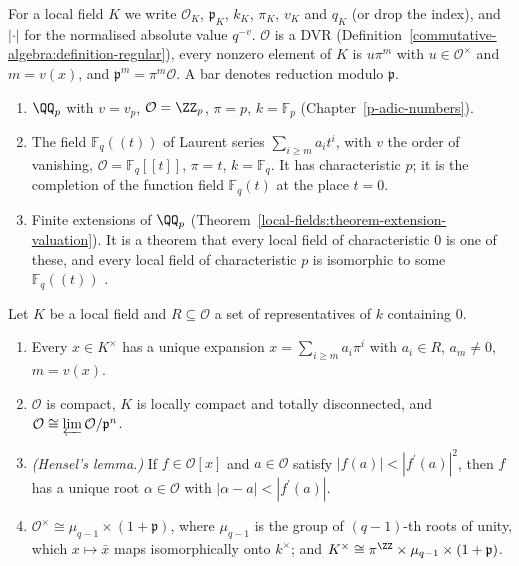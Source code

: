 \begin{notation}\label{local-fields:notation-local}
For a local field $K$ we write $\mathcal{O}_K$, $\mathfrak{p}_K$, $k_K$, $\pi_K$, $v_K$ and $q_K$ (or drop the index), and $|\cdot|$ for the normalised absolute value $q^{-v}$. $\mathcal{O}$ is a DVR
(Definition~\ref{commutative-algebra:definition-regular}), every nonzero element of $K$ is $u\pi^m$ with $u \in \mathcal{O}^\times$ and $m = v(x)$, and $\mathfrak{p}^m = \pi^m\mathcal{O}$. A bar denotes reduction
modulo $\mathfrak{p}$.
\end{notation}

\begin{example}\label{local-fields:example-local-fields}
\begin{enumerate}
\item $\QQ_p$ with $v = v_p$, $\mathcal{O} = \ZZ_p$, $\pi = p$, $k = \mathbb{F}_p$ (Chapter~\ref{p-adic-numbers}).
\item The field $\mathbb{F}_q((t))$ of Laurent series $\sum_{i \geq m}a_it^i$, with $v$ the order of vanishing, $\mathcal{O} = \mathbb{F}_q[[t]]$, $\pi = t$, $k = \mathbb{F}_q$. It has characteristic $p$; it is the
completion of the function field $\mathbb{F}_q(t)$ at the place $t = 0$.
\item Finite extensions of $\QQ_p$ (Theorem~\ref{local-fields:theorem-extension-valuation}). It is a theorem that every local field of characteristic $0$ is one of these, and every local field of
characteristic $p$ is isomorphic to some $\mathbb{F}_q((t))$ \cite[Chapter II, Proposition 5.2]{neukirch-ant}.
\end{enumerate}
\end{example}

\begin{proposition}\label{local-fields:proposition-local-structure}
Let $K$ be a local field and $R \subseteq \mathcal{O}$ a set of representatives of $k$ containing $0$.
\begin{enumerate}
\item Every $x \in K^\times$ has a unique expansion $x = \sum_{i \geq m}a_i\pi^i$ with $a_i \in R$, $a_m \neq 0$, $m = v(x)$.
\item $\mathcal{O}$ is compact, $K$ is locally compact and totally disconnected, and $\mathcal{O} \cong \varprojlim\mathcal{O}/\mathfrak{p}^n$.
\item \emph{(Hensel's lemma.)} If $f \in \mathcal{O}[x]$ and $a \in \mathcal{O}$ satisfy $|f(a)| < |f^{\prime}(a)|^2$, then $f$ has a unique root $\alpha \in \mathcal{O}$ with $|\alpha - a| < |f^{\prime}(a)|$.
\item $\mathcal{O}^\times \cong \mu_{q-1} \times (1 + \mathfrak{p})$, where $\mu_{q-1}$ is the group of $(q - 1)$-th roots of unity, which $x \mapsto \bar x$ maps isomorphically onto $k^\times$; and
$K^\times \cong \pi^{\ZZ} \times \mu_{q-1} \times (1 + \mathfrak{p})$.
\end{enumerate}
\end{proposition}

